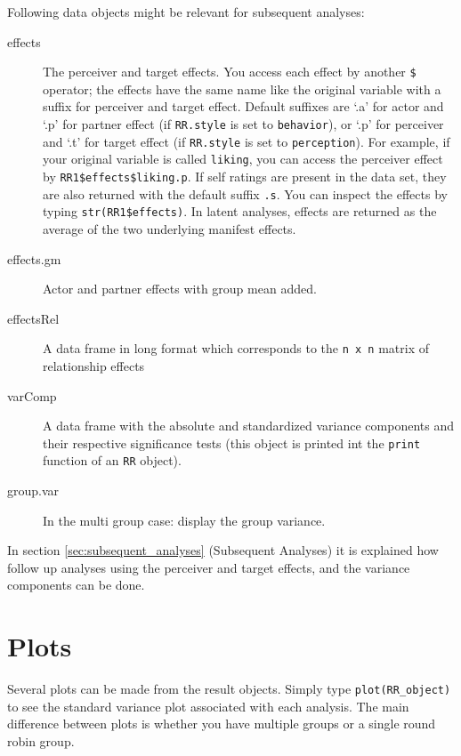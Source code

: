 \documentclass[a4paper]{article}\usepackage[]{graphicx}\usepackage[]{color}
\begin{document}
Following data objects might be relevant for subsequent analyses:
\begin{description}
	\item[effects] The perceiver and target effects. You access each effect by another \texttt{\$} operator; the effects have the same name like the original variable with a suffix for perceiver and target effect. Default suffixes are `.a' for actor and `.p' for partner effect (if \texttt{RR.style} is set to \texttt{behavior}), or `.p' for perceiver and `.t' for target effect (if \texttt{RR.style} is set to \texttt{perception}). For example, if your original variable is called \texttt{liking}, you can access the perceiver effect by \texttt{RR1\$effects\$liking.p}. If self ratings are present in the data set, they are also returned with the default suffix \texttt{.s}. You can inspect the effects by typing \texttt{str(RR1\$effects)}.
	In latent analyses, effects are returned as the average of the two underlying manifest effects.
	\item[effects.gm] Actor and partner effects with group mean added.
	\item[effectsRel] A data frame in long format which corresponds to the \texttt{n x n} matrix of relationship effects
	\item[varComp] A data frame with the absolute and standardized variance components and their respective significance tests (this object is printed int the \texttt{print} function of an \texttt{RR} object).
	\item[group.var] In the multi group case: display the group variance.
\end{description}

In section \ref{sec:subsequent_analyses} (Subsequent Analyses) it is explained how follow up analyses using the perceiver and target effects, and the variance components can be done.






\section{Plots} %
\label{sec:plots}

Several plots can be made from the result objects. Simply type \texttt{plot(RR\_object)} to see the standard variance plot associated with each analysis. The main difference between plots is whether you have multiple groups or a single round robin group.
\end{document}

